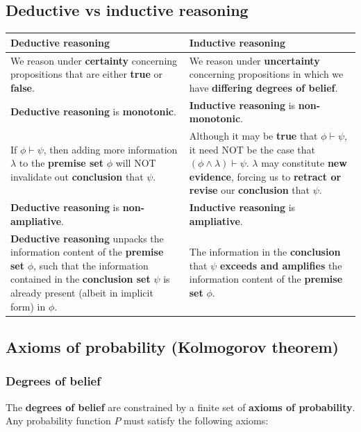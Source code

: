 \documentclass[11pt]{article}
\begin{document}
\subsection{Deductive vs inductive reasoning}
\label{sec:org10247ea}
\begin{center}
\begin{tabularx}{\textwidth}{|X|X|}
\hline
Deductive reasoning & Inductive reasoning\\
\hline
We reason under \textbf{certainty} concerning propositions that are either \textbf{true} or \textbf{false}. & We reason under \textbf{uncertainty} concerning propositions in which we have \textbf{differing degrees of belief}.\\
\hline
\textbf{Deductive reasoning} is \textbf{monotonic}. & \textbf{Inductive reasoning} is \textbf{non-monotonic}.\\
If \(\phi \vdash \psi\), then adding more information \(\lambda\) to the \textbf{premise set} \(\phi\) will NOT invalidate out \textbf{conclusion} that \(\psi\). & Although it may be \textbf{true} that \(\phi \vdash \psi\), it need NOT be the case that \((\phi \wedge \lambda) \vdash \psi\). \(\lambda\) may constitute \textbf{new evidence}, forcing us to \textbf{retract or revise} our \textbf{conclusion} that \(\psi\).\\
\hline
\textbf{Deductive reasoning} is \textbf{non-ampliative}. & \textbf{Inductive reasoning} is \textbf{ampliative}.\\
\textbf{Deductive reasoning} unpacks the information content of the \textbf{premise set} \(\phi\), such that the information contained in the \textbf{conclusion set} \(\psi\) is already present (albeit in implicit form) in \(\phi\). & The information in the \textbf{conclusion} that \(\psi\) \textbf{exceeds and amplifies} the information content of the \textbf{premise set} \(\phi\).\\
\hline
\end{tabularx}
\end{center}
 \newpage
\subsection{Axioms of probability (Kolmogorov theorem)}
\label{sec:org0bd1879}

\subsubsection{Degrees of belief}
\label{sec:orgf7db7cb}
The \textbf{degrees of belief} are constrained by a finite set of \textbf{axioms of probability}. Any probability function \(P\) must satisfy the following axioms:
\end{document}
